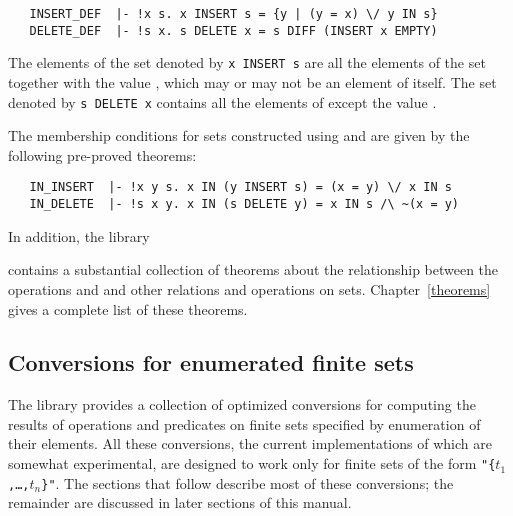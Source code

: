 \begin{hol}
\begin{verbatim}
   INSERT_DEF  |- !x s. x INSERT s = {y | (y = x) \/ y IN s}
   DELETE_DEF  |- !s x. s DELETE x = s DIFF (INSERT x EMPTY)
\end{verbatim}\end{hol}

\noindent The elements of the set denoted by {\small\verb!x INSERT s!} are all
the elements of the set  together with the value , which may or may
not be an element of  itself.  The set denoted by
{\small\verb!s DELETE x!} contains all the elements of 
except the value .

{\samepage The membership conditions for sets constructed using  and
 are given by the following pre-proved theorems:

\begin{hol}
\begin{verbatim}
   IN_INSERT  |- !x y s. x IN (y INSERT s) = (x = y) \/ x IN s
   IN_DELETE  |- !s x y. x IN (s DELETE y) = x IN s /\ ~(x = y)
\end{verbatim}\end{hol}

\noindent In addition, the library} contains a substantial collection of
theorems about the relationship between the operations  and
 and other relations and operations on sets.  Chapter~\ref{theorems}
gives a complete list of these theorems.



\subsection{Conversions for enumerated finite sets}

The  library provides a collection of optimized conversions for
computing the results of operations and predicates on finite sets specified by
enumeration of their elements.  All these conversions, the current
implementations of which are somewhat experimental, are designed to work only
for finite sets of the form {\small\verb!"{!\tt$t_1$,\dots,$t_n$\verb!}"!}.
The sections that follow describe most of these conversions; the remainder are
discussed in later sections of this manual.

